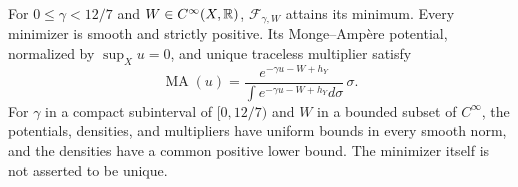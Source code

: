 \begin{theorem}
\label{an:equilibrium}
For $0\le\gamma<12/7$ and $W\in C^\infty(X,\mathbb R)$,
$\mathcal F_{\gamma,W}$ attains its minimum. Every minimizer is smooth
and strictly positive. Its Monge--Amp\`ere potential, normalized by
$\sup_Xu=0$, and unique traceless multiplier satisfy
\begin{equation}
 \operatorname{MA}(u)=
 \frac{e^{-\gamma u-W+h_Y}}
 {\int e^{-\gamma u-W+h_Y}d\sigma}\,\sigma.
 \label{an:equilibrium-pde}
\end{equation}
For $\gamma$ in a compact subinterval of $[0,12/7)$ and $W$ in a bounded
subset of $C^\infty$, the potentials, densities, and multipliers have
uniform bounds in every smooth norm, and the densities have a common
positive lower bound. The minimizer itself is not asserted to be unique.
\end{theorem}


